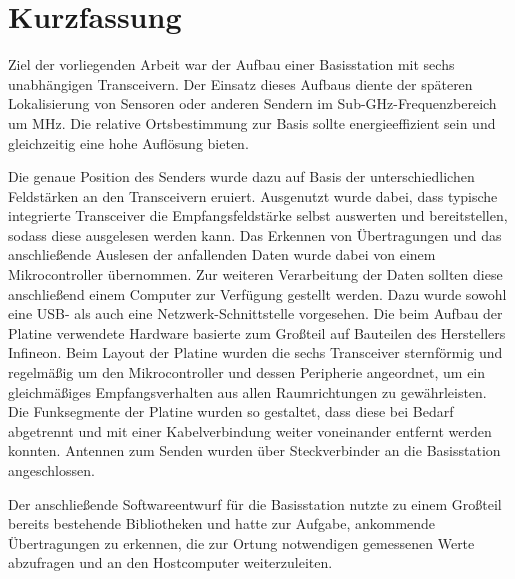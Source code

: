 
\chapter*{Kurzfassung}
\label{sec:kurzfassung}
\pagestyle{scrheadings}

Ziel der vorliegenden Arbeit war der Aufbau einer Basisstation mit sechs unabhängigen Transceivern. Der Einsatz dieses Aufbaus diente der späteren Lokalisierung von Sensoren oder anderen Sendern im Sub-GHz-Frequenzbereich um \unit[868]{MHz}. Die relative Ortsbestimmung zur Basis sollte energieeffizient sein und gleichzeitig eine hohe Auflösung bieten. 

Die genaue Position des Senders wurde dazu auf Basis der unterschiedlichen Feldstärken an den Transceivern eruiert. Ausgenutzt wurde dabei, dass typische integrierte Transceiver die Empfangsfeldstärke selbst auswerten und bereitstellen, sodass diese ausgelesen werden kann. Das Erkennen von Übertragungen und das anschließende Auslesen der anfallenden Daten wurde dabei von einem Mikrocontroller übernommen. Zur weiteren Verarbeitung der Daten sollten diese anschließend einem Computer zur Verfügung gestellt werden. Dazu wurde sowohl eine USB- als auch eine Netzwerk-Schnittstelle vorgesehen. Die beim Aufbau der Platine verwendete Hardware basierte zum Großteil auf Bauteilen des Herstellers Infineon. 
Beim Layout der Platine wurden die sechs Transceiver sternförmig und regelmäßig um den Mikrocontroller und dessen Peripherie angeordnet, um ein gleichmäßiges Empfangsverhalten aus allen Raumrichtungen zu gewährleisten. Die Funksegmente der Platine wurden so gestaltet, dass diese bei Bedarf abgetrennt und mit einer Kabelverbindung weiter voneinander entfernt werden konnten. Antennen zum Senden wurden über Steckverbinder an die Basisstation angeschlossen.

Der anschließende Softwareentwurf für die Basisstation nutzte zu einem Großteil bereits bestehende Bibliotheken und hatte zur Aufgabe, ankommende Übertragungen zu erkennen, die zur Ortung notwendigen gemessenen Werte abzufragen und an den Hostcomputer weiterzuleiten. 

